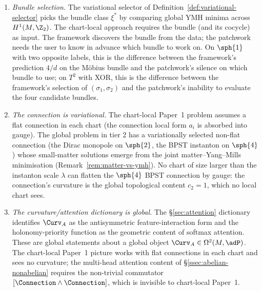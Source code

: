\begin{remark}
\begin{enumerate}[label=(\arabic*),leftmargin=2em]
\item \emph{Bundle selection.} The variational selector of
Definition~\ref{def:variational-selector} picks the bundle class
$\xi^*$ by comparing global YMH minima across $H^1(M,\Z_2)$. The
chart-local approach requires the bundle (and its cocycle) as input.
The framework discovers the bundle from the data; the patchwork
needs the user to know in advance which bundle to work on. On
$\sph{1}$ with two opposite labels, this is the difference between
the framework's prediction $4/d$ on the M\"obius bundle and the
patchwork's silence on which bundle to use; on $T^2$ with XOR, this
is the difference between the framework's selection of
$(\sigma_1,\sigma_2)$ and the patchwork's inability to evaluate the
four candidate bundles.

\item \emph{The connection is variational.} The chart-local Paper~1
problem assumes a flat connection in each chart (the connection
local form $a_i$ is absorbed into gauge). The global problem in
tier 2 has a variationally selected non-flat connection (the Dirac
monopole on $\sph{2}$, the BPST instanton on $\sph{4}$) whose
small-matter solutions emerge from the joint matter--Yang--Mills
minimisation (Remark~\ref{rem:matter-vs-ymh}). No chart of size
larger than the instanton scale $\lambda$ can flatten the
$\sph{4}$ BPST connection by gauge: the connection's curvature is
the global topological content $c_2=1$, which no local chart sees.

\item \emph{The curvature/attention dictionary is global.} The
§\ref{sec:attention} dictionary identifies $\Curv_A$ as the
antisymmetric feature-interaction form and the holonomy-priority
function as the geometric content of softmax attention. These are
global statements about a global object $\Curv_A\in\Omega^2(M,\adP)$.
The chart-local Paper~1 picture works with flat connections in each
chart and sees no curvature; the multi-head attention content of
\S\ref{ssec:abelian-nonabelian} requires the non-trivial commutator
$[\Connection\wedge\Connection]$, which is invisible to chart-local
Paper~1.
\end{enumerate}


\end{remark}
